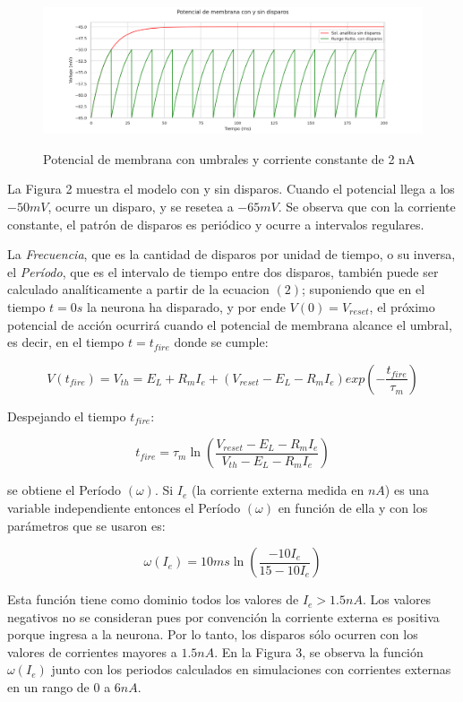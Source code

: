 \documentclass[12pt,letterpaper]{article}
\begin{document}
\begin{figure}[h!]
\begin{floatrow}
\centering
\caption{Potencial de membrana con umbrales y corriente constante de 2 nA}
\includegraphics[width=20cm]{../images/con_umbral.png}
\label{fig:esquema}
\end{floatrow}
\end{figure}

La Figura 2 muestra el modelo con y sin disparos. Cuando el potencial llega a los $-50 mV$, ocurre un disparo, y se resetea a $-65mV$. Se observa que con la corriente constante, el patrón de disparos es periódico y ocurre a intervalos regulares. 

La \textit{Frecuencia}, que es la cantidad de disparos por unidad de tiempo, o su inversa, el \textit{Período}, que es el intervalo de tiempo entre dos disparos, también puede ser calculado analíticamente a partir de la ecuacion $(2)$; suponiendo que en el tiempo $t=0s$ la neurona ha disparado, y por ende $V(0) = V_{reset}$, el próximo potencial de acción ocurrirá cuando el potencial de membrana alcance el umbral, es decir, en el tiempo $t=t_{fire}$ donde se cumple:

$$V(t_{fire}) = V_{th} = E_L + R_m I_e + (V_{reset} - E_L - R_m I_e ) exp\left(-\dfrac{t_{fire}}{\tau_m}\right)$$

Despejando el tiempo $t_{fire}$:

$$t_{fire} = \tau_m \ln\left(\dfrac{V_{reset} - E_L - R_mI_e}{V_{th} - E_L - R_m I_e}\right)$$

se obtiene el Período $(\omega)$. Si $I_e$ (la corriente externa medida en $nA$) es una variable independiente entonces el Período $(\omega)$ en función de ella y con los parámetros que se usaron es:

$$\omega(I_e) = 10ms \ln\left(\dfrac{-10I_e}{15 -10I_e }\right)$$

Esta función tiene como dominio todos los valores de $I_e > 1.5 nA$. Los valores negativos no se consideran pues por convención la corriente externa es positiva porque ingresa a la neurona. Por lo tanto, los disparos sólo ocurren con los valores de corrientes mayores a $1.5 nA$. En la Figura 3, se observa la función $\omega(I_e)$ junto con los periodos calculados en simulaciones con corrientes externas en un rango de  $0$ a $6 nA$. 
\end{document}
